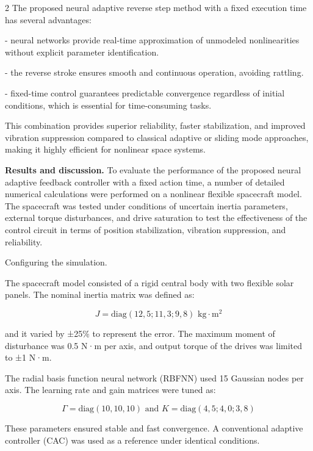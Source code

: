 \begin{multicols}{2}
The proposed neural adaptive reverse step method with a fixed execution
time has several advantages:

- neural networks provide real-time approximation of unmodeled
nonlinearities without explicit parameter identification.

- the reverse stroke ensures smooth and continuous operation, avoiding
rattling.

- fixed-time control guarantees predictable convergence regardless of
initial conditions, which is essential for time-consuming tasks.

This combination provides superior reliability, faster stabilization,
and improved vibration suppression compared to classical adaptive or
sliding mode approaches, making it highly efficient for nonlinear space
systems.

{\bfseries Results and discussion.} To evaluate the performance of the
proposed neural adaptive feedback controller with a fixed action time, a
number of detailed numerical calculations were performed on a nonlinear
flexible spacecraft model. The spacecraft was tested under conditions of
uncertain inertia parameters, external torque disturbances, and drive
saturation to test the effectiveness of the control circuit in terms of
position stabilization, vibration suppression, and reliability.

Configuring the simulation.

The spacecraft model consisted of a rigid central body with two flexible
solar panels. The nominal inertia matrix was defined as:

\begin{equation*}
J = \text{diag} (12,5; 11,3; 9,8) \text{ kg} \cdot \text{m}^2
\end{equation*}

and it varied by ±25\% to represent the error. The maximum moment of
disturbance was 0.5 N·m per axis, and output torque of the drives was
limited to ±1 N·m.

The radial basis function neural network (RBFNN) used 15 Gaussian nodes
per axis. The learning rate and gain matrices were tuned as:

\begin{equation*}
\Gamma = \text{diag} (10, 10, 10) \text{ and } K = \text{diag} (4,5; 4,0; 3,8)
\end{equation*}

These parameters ensured stable and fast convergence. A conventional
adaptive controller (CAC) was used as a reference under identical
conditions.


\end{multicols}

